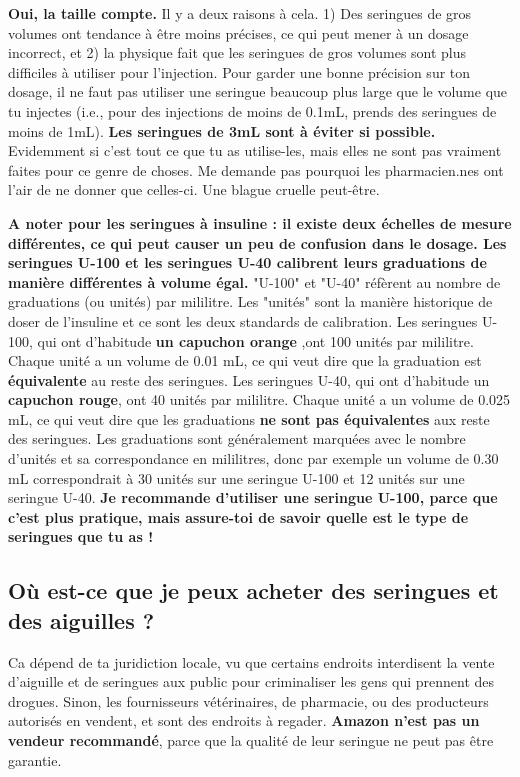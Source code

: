 \documentclass{article}
\begin{document}
\textbf{Oui, la taille compte.} Il y a deux raisons à cela. 1) Des seringues de gros volumes ont tendance à être moins précises, ce qui peut mener à un dosage incorrect, et 2) la physique fait que les seringues de gros volumes sont plus difficiles à utiliser pour l'injection. Pour garder une bonne précision sur ton dosage, il ne faut pas utiliser une seringue beaucoup plus large que le volume que tu injectes (i.e., pour des injections de moins de 0.1mL, prends des seringues de moins de 1mL). \textbf{Les seringues de 3mL sont à éviter si possible.} Evidemment si c'est tout ce que tu as utilise-les, mais elles ne sont pas vraiment faites pour ce genre de choses. Me demande pas pourquoi les pharmacien.nes ont l'air de ne donner que celles-ci. Une blague cruelle peut-être.

\textbf{A noter pour les seringues à insuline : il existe deux échelles de mesure différentes, ce qui peut causer un peu de confusion dans le dosage. Les seringues U-100 et les seringues U-40 calibrent leurs graduations de manière différentes à volume égal.} "U-100" et "U-40" réfèrent au nombre de graduations (ou unités) par mililitre. Les "unités" sont la manière historique de doser de l'insuline et ce sont les deux standards de calibration. Les seringues U-100, qui ont d'habitude \textbf{un capuchon orange} ,ont 100 unités par mililitre. Chaque unité a un volume de 0.01 mL, ce qui veut dire que la graduation est \textbf{équivalente} au reste des seringues. Les seringues U-40, qui ont d'habitude un \textbf{capuchon rouge}, ont 40 unités par mililitre. Chaque unité a un volume de 0.025 mL, ce qui veut dire que les graduations \textbf{ne sont pas équivalentes} aux reste des seringues. Les graduations sont généralement marquées avec le nombre d'unités et sa correspondance en mililitres, donc par exemple un volume de 0.30 mL correspondrait à 30 unités sur une seringue U-100 et 12 unités sur une seringue U-40. \textbf{Je recommande d'utiliser une seringue U-100, parce que c'est plus pratique, mais assure-toi de savoir quelle est le type de seringues que tu as !}

\subsection{Où est-ce que je peux acheter des seringues et des aiguilles ?}

Ca dépend de ta juridiction locale, vu que certains endroits interdisent la vente d'aiguille et de seringues aux public pour criminaliser les gens qui prennent des drogues. Sinon, les fournisseurs vétérinaires, de pharmacie, ou des producteurs autorisés en vendent, et sont des endroits à regader. \textbf{Amazon n'est pas un vendeur recommandé}, parce que la qualité de leur seringue ne peut pas être garantie.
\end{document}
